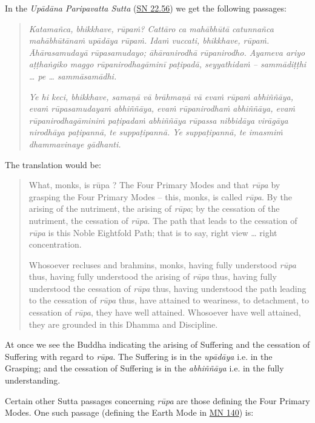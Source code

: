 In the \emph{Upādāna Paripavatta Sutta} (\href{https://suttacentral.net/sn22.56/en/bodhi}{SN 22.56}) we get the following passages:

\begin{quote}
\emph{Katamañca, bhikkhave, rūpaṁ? Cattāro ca mahābhūtā catunnañca mahābhūtānaṁ upādāya rūpaṁ. Idaṁ vuccati, bhikkhave, rūpaṁ. Āhārasamudayā rūpasamudayo; āhāranirodhā rūpanirodho. Ayameva ariyo aṭṭhaṅgiko maggo rūpanirodhagāminī paṭipadā, seyyathidaṁ -- sammādiṭṭhi \ldots{} pe \ldots{} sammāsamādhi.}

\emph{Ye hi keci, bhikkhave, samaṇā vā brāhmaṇā vā evaṁ rūpaṁ abhiññāya, evaṁ rūpasamudayaṁ abhiññāya, evaṁ rūpanirodhaṁ abhiññāya, evaṁ rūpanirodhagāminiṁ paṭipadaṁ abhiññāya rūpassa nibbidāya virāgāya nirodhāya paṭipannā, te suppaṭipannā. Ye suppaṭipannā, te imasmiṁ dhammavinaye gādhanti.}
\end{quote}

The translation would be:

\begin{quote}
What, monks, is rūpa ? The Four Primary Modes and that \emph{rūpa} by grasping the Four Primary Modes -- this, monks, is called \emph{rūpa}. By the arising of the nutriment, the arising of \emph{rūpa}; by the cessation of the nutriment, the cessation of \emph{rūpa}. The path that leads to the cessation of \emph{rūpa} is this Noble Eightfold Path; that is to say, right view \ldots\hspace{0pt} right concentration.

Whosoever recluses and brahmins, monks, having fully understood \emph{rūpa} thus, having fully understood the arising of \emph{rūpa} thus, having fully understood the cessation of \emph{rūpa} thus, having understood the path leading to the cessation of \emph{rūpa} thus, have attained to weariness, to detachment, to cessation of \emph{rūpa}, they have well attained. Whosoever have well attained, they are grounded in this Dhamma and Discipline.
\end{quote}

At once we see the Buddha indicating the arising of Suffering and the cessation of Suffering with regard to \emph{rūpa}. The Suffering is in the \emph{upādāya} i.e. in the Grasping; and the cessation of Suffering is in the \emph{abhiññāya} i.e. in the fully understanding.

Certain other Sutta passages concerning \emph{rūpa} are those defining the Four Primary Modes. One such passage (defining the Earth Mode in \href{https://suttacentral.net/mn140/en/bodhi}{MN 140}) is:

